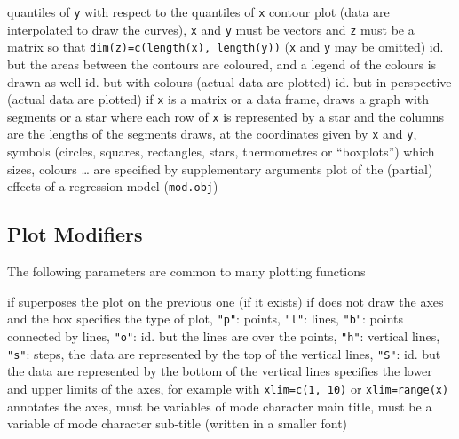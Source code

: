	{quantiles of {\tt y} with respect to the quantiles of {\tt x}}
	{contour plot (data are interpolated to draw the curves), {\tt x} and {\tt y} must be vectors and {\tt z} must be a matrix so that {\tt dim(z)=c(length(x), length(y))} ({\tt x} and {\tt y} may be omitted)}
	{ id. but the areas between the contours are coloured, and a legend of the colours is drawn as well}
	{ id. but with colours (actual data are plotted)}
	{ id. but in perspective (actual data are plotted)}
	{if {\tt x} is a matrix or a data frame, draws a graph with segments or a star where each row of {\tt x} is represented by a star and the columns are the lengths of the segments}
	{draws, at the coordinates given by {\tt x} and {\tt y}, symbols (circles, squares, rectangles, stars, thermometres or ``boxplots'') which sizes, colours \ldots{} are specified by supplementary arguments}
	{ plot of the (partial) effects of a regression model ({\tt mod.obj})}

\subsection{Plot Modifiers}{The following parameters are common to many
    plotting functions}

	{if \T superposes the plot on the previous one (if it exists)}
	{if \F does not draw the axes and the box}
	{ specifies the type of plot, {\tt "p"}: points, {\tt "l"}: lines, {\tt "b"}: points connected by lines, {\tt "o"}: id. but the lines are over the points, {\tt "h"}: vertical lines, {\tt "s"}: steps, the data are represented by the top of the vertical lines, {\tt "S"}: id. but the data are represented by the bottom of the vertical lines}
	{specifies the lower and upper limits of the axes, for example with {\tt xlim=c(1, 10)} or {\tt xlim=range(x)}}
	{ annotates the axes, must be variables of mode character}
	{ main title, must be a variable of mode character}
	{ sub-title (written in a smaller font)}

